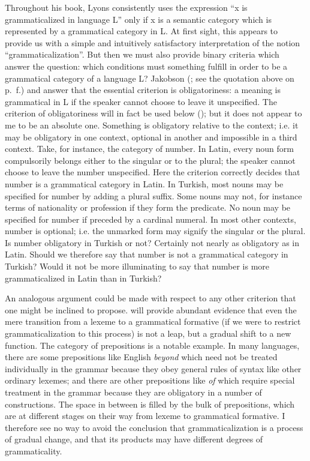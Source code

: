 \noindent Throughout his book, Lyons consistently uses the expression ``x is grammaticalized in language L'' only if x is a semantic category which is represented by a grammatical category in L. At first sight, this appears to provide us with a simple and intuitively satisfactory interpretation of the notion ``grammaticalization''. But then we must also provide binary criteria which answer the question:\label{page14b} which conditions must something fulfill in order to be a grammatical category of a language L? Jakobson (\citeyear[489]{Jakobson1959}; see the quotation above on p.~\pageref{quote:Jakobson}f.) and \citet[84]{Mel'čuk1976} answer that the essential criterion is obligatoriness: a meaning is grammatical in L if the speaker cannot choose to leave it unspecified. The criterion of obligatoriness will in fact be used below (); but it does not appear to me to be an absolute one. Something is obligatory relative to the context; i.e. it may be obligatory in one context, optional in another and impossible in a third context.\label{page14} Take, for instance, the category of number. In Latin, every noun form compulsorily belongs either to the singular or to the plural; the speaker cannot choose to leave the number unspecified. Here the criterion correctly decides that number is a grammatical category in Latin. In Turkish, most nouns may be specified for number by adding a plural suffix. Some nouns may not, for instance terms of nationality or profession if they form the predicate. No noun may be specified for number if preceded by a cardinal numeral. In most other contexts, number is optional; i.e. the unmarked form may signify the singular or the plural. Is number obligatory in Turkish or not? Certainly not nearly as obligatory as in Latin. Should we therefore say that number is not a grammatical category in Turkish? Would it not be more illuminating to say that number is more grammaticalized in Latin than in Turkish?

An analogous argument could be made with respect to any other criterion that one might be inclined to propose.  will provide abundant evidence that even the mere transition from a lexeme to a grammatical formative (if we were to restrict grammaticalization to this process) is not a leap, but a gradual shift to a new function. The category of prepositions is a notable example. In many languages, there are some prepositions like English \textit{beyond} which need not be treated individually in the grammar because they obey general rules of syntax like other ordinary lexemes; and there are other prepositions like \textit{of} which require special treatment in the grammar because they are obligatory in a number of constructions. The space in between is filled by the bulk of prepositions, which are at different stages on their way from lexeme to grammatical formative. I therefore see no way to avoid the conclusion that grammaticalization is a process of gradual change, and that its products may have different degrees of grammaticality.

